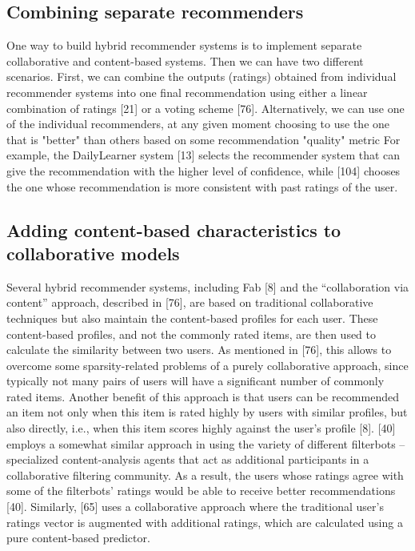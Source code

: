 \subsection{Combining separate recommenders}
One way to build hybrid recommender systems is to implement separate collaborative and content-based systems. Then we can have two different scenarios.
First, we can combine the outputs (ratings) obtained from individual recommender systems into one final recommendation using either a linear combination of ratings [21] or a voting scheme [76]. 
Alternatively, we can use one of the individual recommenders, at any given moment choosing to use the one that is "better" than others based on some recommendation "quality" metric 
For example, the DailyLearner system [13] selects the recommender system that can give the recommendation with the higher level of confidence, while [104] chooses the one whose recommendation is more consistent with past ratings of the user.

\subsection{Adding content-based characteristics to collaborative models}
Several hybrid recommender systems, including Fab [8] and the “collaboration via content” approach, described in [76], are based on traditional collaborative techniques but also maintain the content-based profiles for each user. These content-based profiles, and not the commonly rated items, are then used to calculate the similarity between two users. As mentioned in [76], this allows to overcome some sparsity-related problems of a purely collaborative approach, since typically not many pairs of users will have a significant number of commonly rated items. Another benefit of this approach is that users can be recommended an item not only when this item is rated highly by users with similar profiles, but also directly, i.e., when this item scores highly against the user’s profile [8]. [40] employs a somewhat similar approach in using the variety of different filterbots – specialized content-analysis agents that act as additional participants in a collaborative filtering community. As a result, the users whose ratings agree with some of the filterbots’ ratings would be able to receive better recommendations [40]. Similarly, [65] uses a collaborative approach where the traditional user’s ratings vector is augmented with additional ratings, which are calculated using a pure content-based predictor.


